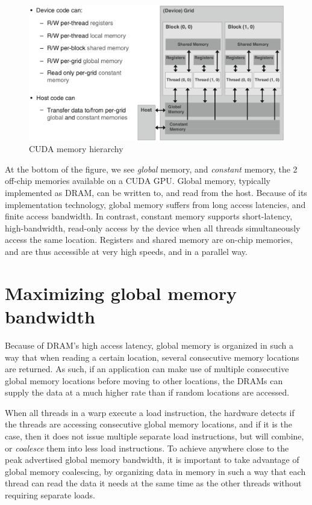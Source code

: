 \documentclass[10pt, a4paper]{report}
\begin{document}
\begin{figure}[h]
\centering
\includegraphics[scale=0.25]{figs/cuda_memory_hierarchy}
\caption{CUDA memory hierarchy}
\label{fig:cuda_memory_hierarchy}
\end{figure}

At the bottom of the figure, we see \emph{global} memory, and \emph{constant}
memory, the 2 off-chip memories available on a CUDA GPU.
Global memory, typically implemented as DRAM, can be written to, and read from
the host.
Because of its implementation technology, global memory suffers from long access
latencies, and finite access bandwidth.
In contrast, constant memory supports short-latency, high-bandwidth, read-only
access by the device when all threads simultaneously access the same location.
Registers and shared memory are on-chip memories, and are thus accessible at
very high speeds, and in a parallel way.

\section{Maximizing global memory bandwidth}
Because of DRAM's high access latency, global memory is organized in such a way
that when reading a certain location, several consecutive memory locations are
returned.
As such, if an application can make use of multiple consecutive global memory locations
before moving to other locations, the DRAMs can supply the data at a much higher
rate than if random locations are accessed.

When all threads in a warp execute a load instruction, the hardware detects if
the threads are accessing consecutive global memory locations, and if it is the
case, then it does not issue multiple separate load instructions, but will
combine, or \emph{coalesce} them into less load instructions.
To achieve anywhere close to the peak advertised global memory bandwidth, it is
important to take advantage of global memory coalescing, by organizing data in
memory in such a way that each thread can read the data it needs at the same
time as the other threads without requiring separate loads.
\end{document}
